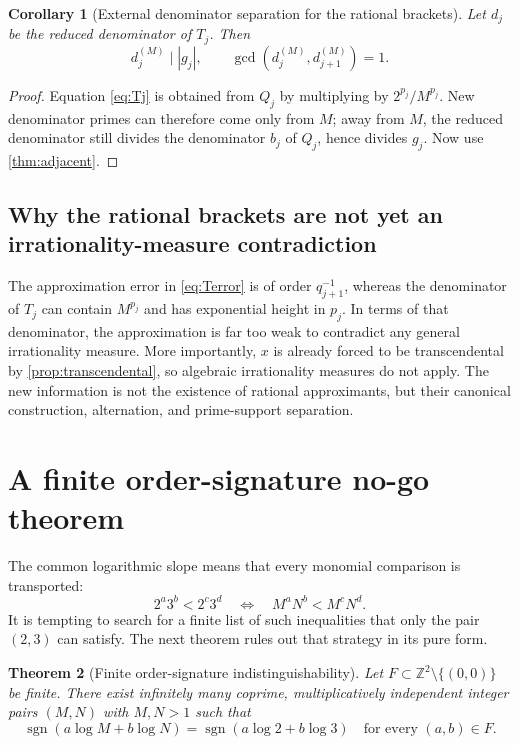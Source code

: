 \documentclass[11pt,oneside]{article}
\newtheorem{theorem}{Theorem}[section]
\newtheorem{corollary}[theorem]{Corollary}
\theoremstyle{definition}
\theoremstyle{remark}
\newcommand{\Z}{\mathbb Z}
\newcommand{\sgn}{\operatorname{sgn}}
\newcommand{\abs}[1]{\left|#1\right|}
\begin{document}
\begin{corollary}[External denominator separation for the rational brackets]
\label{cor:Textden}
Let $d_j$ be the reduced denominator of $T_j$.  Then
\[
 d_j^{(M)}\mid\abs{g_j},\qquad
 \gcd(d_j^{(M)},d_{j+1}^{(M)})=1.
\]
\end{corollary}

\begin{proof}
Equation \eqref{eq:Tj} is obtained from $Q_j$ by multiplying by
$2^{p_j}/M^{p_j}$.  New denominator primes can therefore come only from $M$;
away from $M$, the reduced denominator still divides the denominator $b_j$ of
$Q_j$, hence divides $g_j$.  Now use \cref{thm:adjacent}.
\end{proof}

\subsection{Why the rational brackets are not yet an irrationality-measure
contradiction}

The approximation error in \eqref{eq:Terror} is of order $q_{j+1}^{-1}$,
whereas the denominator of $T_j$ can contain $M^{p_j}$ and has exponential
height in $p_j$.  In terms of that denominator, the approximation is far too
weak to contradict any general irrationality measure.  More importantly,
$x$ is already forced to be transcendental by \cref{prop:transcendental}, so
algebraic irrationality measures do not apply.  The new information is not
the existence of rational approximants, but their canonical construction,
alternation, and prime-support separation.

\section{A finite order-signature no-go theorem}
\label{sec:signature}

The common logarithmic slope means that every monomial comparison is
transported:
\[
  2^a3^b<2^c3^d
  \quad\Longleftrightarrow\quad
  M^aN^b<M^cN^d.
\]
It is tempting to search for a finite list of such inequalities that only the
pair $(2,3)$ can satisfy.  The next theorem rules out that strategy in its
pure form.

\begin{theorem}[Finite order-signature indistinguishability]
\label{thm:signature}
Let $F\subset\Z^2\setminus\{(0,0)\}$ be finite.  There exist infinitely many
coprime, multiplicatively independent integer pairs $(M,N)$ with $M,N>1$ such
that
\begin{equation}
 \sgn(a\log M+b\log N)
 =\sgn(a\log2+b\log3)
 \quad\text{for every }(a,b)\in F.
 \label{eq:signature}
\end{equation}
\end{theorem}
\end{document}

